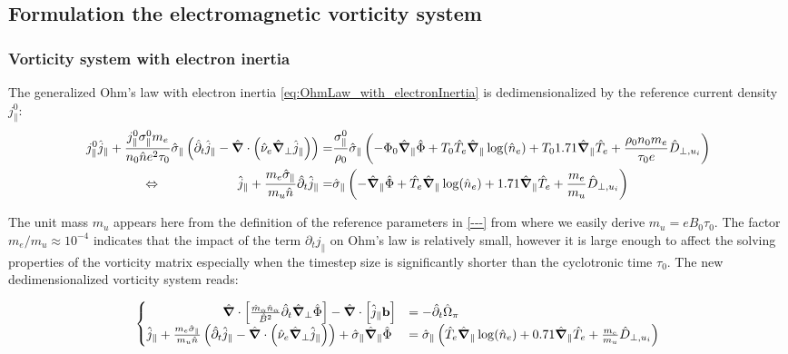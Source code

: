 \subsection{Formulation the electromagnetic vorticity system}
\label{sec:S3X_formulationEMsystem}
\subsubsection{Vorticity system with electron inertia}
The generalized Ohm's law with electron inertia \autoref{eq:OhmLaw_with_electronInertia} is dedimensionalized by the reference current density $j_\parallel^0$:
\begin{align*}
j_\parallel^0\hat{j}_\parallel + \frac{j_\parallel^0\sigma_\parallel^0m_e}{n_0\hat{n}e^2\tau_0} \hat{\sigma}_\parallel\left(\hat{\partial}_t\hat{j}_\parallel - \hat{\grad}\cdot\left(\hat{\nu}_e\hat{\grad}_\perp \hat{j}_\parallel\right)\right) =& \frac{\sigma_\parallel^0}{\rho_0}\hat{\sigma}_\parallel \left(-\Phi_0 \hat{\grad}_\parallel\hat{\Phi} + T_0\hat{T}_e\hat{\grad}_\parallel\log(\hat{n}_e) + T_01.71\hat{\grad}_\parallel \hat{T}_e + \frac{\rho_0n_0m_e}{\tau_0e}\hat{D}_{\perp,u_i}\right) \\
\Leftrightarrow\qquad\qquad\qquad
\hat{j}_\parallel + \frac{m_e\hat{\sigma}_\parallel}{m_u\hat{n}} \hat{\partial}_t\hat{j}_\parallel =& \hat{\sigma}_\parallel \left(-\hat{\grad}_\parallel\hat{\Phi} + \hat{T}_e\hat{\grad}_\parallel\log(\hat{n}_e) + 1.71\hat{\grad}_\parallel \hat{T}_e+\frac{m_e}{m_u}\hat{D}_{\perp,u_i}\right)
\end{align*}
	
	The unit mass $m_u$ appears here from the definition of the reference parameters in \autoref{---} from where we easily derive $m_u = eB_0\tau_0$. The factor $m_e / m_u \approx 10^{-4}$ indicates that the impact of the term $\partial_t j_\parallel$ on Ohm's law is relatively small, however it is large enough to affect the solving properties of the vorticity matrix especially when the timestep size is significantly shorter than the cyclotronic time $\tau_0$. The new dedimensionalized vorticity system reads:
	
	
\begin{equation}
\label{eq:vorticityEquation_ElectronInertia_dedimensionalized}
\begin{cases}
\qquad\qquad\qquad \hat{\grad}\cdot\left[\frac{\hat{m}_\alpha \hat{n}_\alpha}{ \hat{B}^2}\hat{\partial}_t\hat{\grad}_\perp\hat{\Phi}\right] - \hat{\grad}\cdot\left[\hat{j}_\parallel \mathbf{b}\right]
&= -\hat{\partial}_t \hat{\Omega}_\pi \\
\hat{j}_\parallel + \frac{m_e\hat{\sigma}_\parallel}{m_u\hat{n}}\left(\hat{\partial}_t\hat{j}_\parallel - \hat{\grad}\cdot\left(\hat{\nu}_e\hat{\grad}_\perp \hat{j}_\parallel\right)\right) + \hat{\sigma}_\parallel\hat{\grad}_\parallel\hat{\Phi} &= \hat{\sigma}_\parallel \left(\hat{T}_e\hat{\grad}_\parallel\log(\hat{n}_e) + 0.71\hat{\grad}_\parallel \hat{T}_e + \frac{m_e}{m_u}\hat{D}_{\perp,u_i}\right)
\end{cases}
\end{equation}

